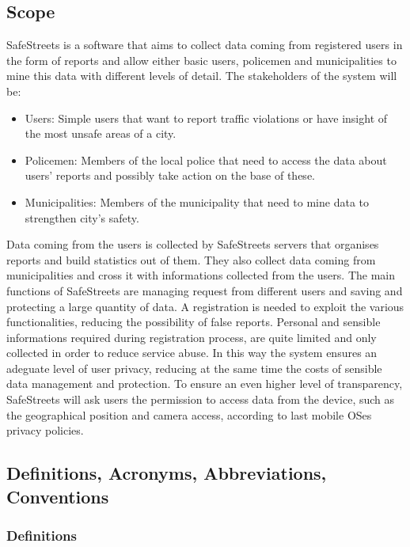 \subsection{Scope}
SafeStreets is a software that aims to collect data coming from registered users in the form of reports and allow either basic users, policemen and municipalities to mine this data with different levels of detail.
The stakeholders of the system will be:
\begin{itemize}
	\item Users: Simple users that want to report traffic violations or have insight of the most unsafe areas of a city.
	\item Policemen: Members of the local police that need to access the data about users' reports and possibly take action on the base of these. 
	\item Municipalities: Members of the municipality that need to mine data to strengthen city's safety.
\end{itemize}
Data coming from the users is collected by SafeStreets servers that organises reports and build statistics out of them.
They also collect data coming from municipalities and cross it with informations collected from the users.
The main functions of SafeStreets are managing request from different users and saving and protecting a large quantity of data.\newline
A registration is needed to exploit the various functionalities, reducing the possibility of false reports. Personal and sensible informations required during registration process, are quite limited and only collected in order to reduce service abuse. In this way the system ensures an adeguate level of user privacy, reducing at the same time the costs of sensible data management and protection.\newline
To ensure an even higher level of transparency, SafeStreets will ask users the permission to access data from the device, such as the geographical position and camera access, according to last mobile OSes privacy policies.

\subsection{Definitions, Acronyms, Abbreviations, Conventions}
\subsubsection{Definitions}

